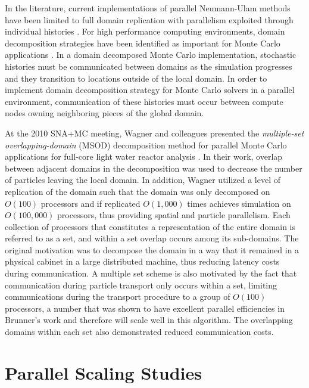 \documentclass{snamc2013}
\begin{document}
In the literature, current implementations of parallel Neumann-Ulam
methods have been limited to full domain replication with parallelism
exploited through individual histories
\cite{alexandrov_efficient_1998}. For high performance computing
environments, domain decomposition strategies have been identified as
important for Monte Carlo applications
\cite{brunner_comparison_2006,siegel_analysis_2012}. In a domain
decomposed Monte Carlo implementation, stochastic histories must be
communicated between domains as the simulation progresses and they
transition to locations outside of the local domain. In order to
implement domain decomposition strategy for Monte Carlo solvers in a
parallel environment, communication of these histories must occur
between compute nodes owning neighboring pieces of the global domain.

At the 2010 SNA+MC meeting, Wagner and colleagues presented the
\textit{multiple-set overlapping-domain} (MSOD) decomposition method
for parallel Monte Carlo applications for full-core light water
reactor analysis \cite{wagner_hybrid_2010}. In their work, overlap
between adjacent domains in the decomposition was used to decrease the
number of particles leaving the local domain. In addition, Wagner
utilized a level of replication of the domain such that the domain was
only decomposed on $O(100)$ processors and if replicated $O(1,000)$
times achieves simulation on $O(100,000)$ processors, thus providing
spatial and particle parallelism. Each collection of processors that
constitutes a representation of the entire domain is referred to as a
set, and within a set overlap occurs among its sub-domains. The
original motivation was to decompose the domain in a way that it
remained in a physical cabinet in a large distributed machine, thus
reducing latency costs during communication. A multiple set scheme is
also motivated by the fact that communication during particle
transport only occurs within a set, limiting communications during the
transport procedure to a group of $O(100)$ processors, a number that
was shown to have excellent parallel efficiencies in Brunner's work
\cite{brunner_efficient_2009} and therefore will scale well in this
algorithm. The overlapping domains within each set also demonstrated
reduced communication costs.

\section{Parallel Scaling Studies}
\end{document}
